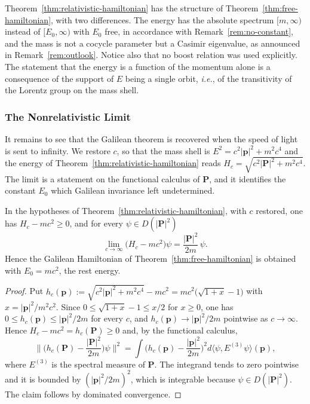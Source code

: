 	\begin{remark}\label{rem:contraction}
		Theorem~\ref{thm:relativistic-hamiltonian} has the structure of Theorem~\ref{thm:free-hamiltonian}, with two differences. The energy has the absolute spectrum $[m,\infty)$ instead of $[E_0,\infty)$ with $E_0$ free, in accordance with Remark~\ref{rem:no-constant}, and the mass is not a cocycle parameter but a Casimir eigenvalue, as announced in Remark~\ref{rem:outlook}. Notice also that no boost relation was used explicitly. The statement that the energy is a function of the momentum alone is a consequence of the support of $E$ being a single orbit, \textit{i.e.}, of the transitivity of the Lorentz group on the mass shell.
	\end{remark}
	
	\subsubsection*{The Nonrelativistic Limit}
	
	It remains to see that the Galilean theorem is recovered when the speed of light is sent to infinity. We restore $c$, so that the mass shell is $E^2=c^2|\mathbf{p}|^2+m^2c^4$ and the energy of Theorem~\ref{thm:relativistic-hamiltonian} reads $H_c=\sqrt{c^2|\mathbf{P}|^2+m^2c^4}$. The limit is a statement on the functional calculus of $\mathbf{P}$, and it identifies the constant $E_0$ which Galilean invariance left undetermined.
	
	\begin{proposition}\label{prop:nonrelativistic-limit}
		In the hypotheses of Theorem~\ref{thm:relativistic-hamiltonian}, with $c$ restored, one has $H_c-mc^2\geq0$, and for every $\psi\in D(|\mathbf{P}|^2)$
		\begin{equation*}
			\lim_{c\to\infty}\big(H_c-mc^2\big)\psi=\frac{|\mathbf{P}|^2}{2m}\,\psi.
		\end{equation*}
		Hence the Galilean Hamiltonian of Theorem~\ref{thm:free-hamiltonian} is obtained with $E_0=mc^2$, the rest energy.
	\end{proposition}
	
	\begin{proof}
		Put $h_c(\mathbf{p}):=\sqrt{c^2|\mathbf{p}|^2+m^2c^4}-mc^2=mc^2\big(\sqrt{1+x}-1\big)$ with $x=|\mathbf{p}|^2/m^2c^2$. Since $0\leq\sqrt{1+x}-1\leq x/2$ for $x\geq0$, one has $0\leq h_c(\mathbf{p})\leq|\mathbf{p}|^2/2m$ for every $c$, and $h_c(\mathbf{p})\to|\mathbf{p}|^2/2m$ pointwise as $c\to\infty$. Hence $H_c-mc^2=h_c(\mathbf{P})\geq0$ and, by the functional calculus,
		\begin{equation*}
			\Big\|\Big(h_c(\mathbf{P})-\frac{|\mathbf{P}|^2}{2m}\Big)\psi\Big\|^2=\int\Big(h_c(\mathbf{p})-\frac{|\mathbf{p}|^2}{2m}\Big)^2d\langle\psi,E^{(3)}\psi\rangle(\mathbf{p}),
		\end{equation*}
		where $E^{(3)}$ is the spectral measure of $\mathbf{P}$. The integrand tends to zero pointwise and it is bounded by $(|\mathbf{p}|^2/2m)^2$, which is integrable because $\psi\in D(|\mathbf{P}|^2)$. The claim follows by dominated convergence.
	\end{proof}
	
